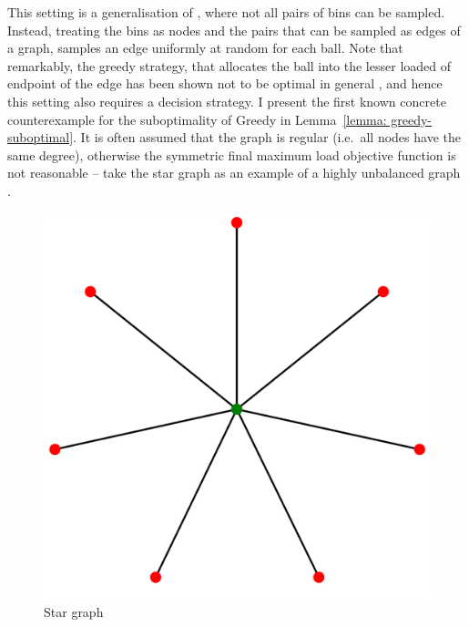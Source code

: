 This setting is a generalisation of \TwoChoice, where not all pairs of bins can be sampled. Instead, treating the bins as nodes and the pairs that can be sampled as edges of a graph, \GraphicalTwoChoice samples an edge uniformly at random for each ball. Note that remarkably, the greedy strategy, that allocates the ball into the lesser loaded of endpoint of the edge has been shown not to be optimal in general , and hence this setting also requires a decision strategy. I present the first known concrete counterexample for the suboptimality of Greedy in Lemma~\ref{lemma: greedy-suboptimal}. It is often assumed that the graph is regular (i.e.\ all nodes have the same degree), otherwise the symmetric final maximum load objective function is not reasonable -- take the star graph as an example of a highly unbalanced graph .

\begin{figure}[hbt!] \label{star-graph}
    \centering
    \includegraphics[scale=0.1]{Chapter2/Figs/star_graph.png}
    \caption{Star graph~\cite{stargraph}}
\end{figure}

